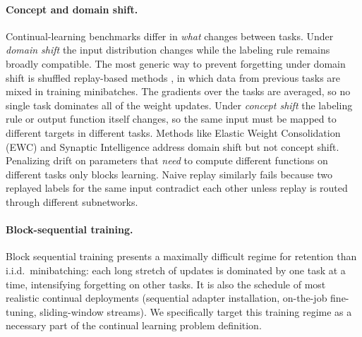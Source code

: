 \documentclass[11pt]{article}
\begin{document}
\paragraph{Concept and domain shift.}
Continual-learning benchmarks differ in \emph{what} changes between tasks. Under \emph{domain shift} the input distribution changes while the labeling rule remains broadly compatible. The most generic way to prevent forgetting under domain shift is shuffled replay-based methods \citep{lopez2017gradient,chaudhry2018efficient,buzzega2020dark}, in which data from previous tasks are mixed in training minibatches. The gradients over the tasks are averaged, so no single task dominates all of the weight updates. Under \emph{concept shift} the labeling rule or output function itself changes, so the same input must be mapped to different targets in different tasks. Methods like Elastic Weight Consolidation (EWC) and Synaptic Intelligence \citep{kirkpatrick2017overcoming,zenke2017continual} address domain shift but not concept shift. Penalizing drift on parameters that \emph{need} to compute different functions on different tasks only blocks learning. Naive replay similarly fails because two replayed labels for the same input contradict each other unless replay is routed through different subnetworks.

\paragraph{Block-sequential training.}
Block sequential training presents a maximally difficult regime for retention than i.i.d.\ minibatching: each long stretch of updates is dominated by one task at a time, intensifying forgetting on other tasks. It is also the schedule of most realistic continual deployments (sequential adapter installation, on-the-job fine-tuning, sliding-window streams). We specifically target this training regime as a necessary part of the continual learning problem definition.
\end{document}

